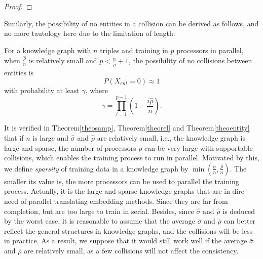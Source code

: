 \documentclass[sigconf]{acmart}
\begin{document}
\begin{proof}
\end{proof}


Similarly, the possibility of no entities in a collision can be derived as follows, and no more tautology here due to the limitation of length.
\begin{theorem}
\label{theoentity}
For a knowledge graph with $n$ triples and training in $p$ processors in parallel, 
when $\frac{\hat{\rho}}{n}$ is relatively small and $p < \frac{n}{\hat{\rho}}+1$, the possibility of no collisions between entities is 
\begin{equation}
P(X_{ent}=0) \approx 1
\end{equation}
with probability at least $\gamma$, where 
\begin{equation}
\gamma=\prod \limits_{i=1}^{p-1}(1- \frac{i\hat{\rho}}{n}).
\end{equation}
\end{theorem}


It is verified in Theorem\ref{theosamp}, Theorem\ref{theorel} and Theorem\ref{theoentity} that if $n$ is large and $\hat{\sigma}$ and $\hat{\rho}$ are relatively small, i.e., the knowledge graph is large and sparse, the number of processors $p$ can be very large with supportable collisions, which enables the training process to run in parallel. Motivated by this, we define \emph{sparsity} of training data in a knowledge graph by $\min(\frac{\hat{\sigma}}{n},\frac{\hat{\rho}}{n})$. The smaller its value is, the more processors can be used to parallel the training process. Actually, it is the large and sparse knowledge graphs that are in dire need of  parallel translating embedding methods. Since they are far from completion, but are too large to train in serial. Besides, since $\hat{\sigma}$ and $\hat{\rho}$ is deduced by the worst case, it is reasonable to assume that the average $\bar{{\sigma}}$ and $\bar{{\rho}}$  can better reflect the general structures in knowledge graphs, and the collisions will be less in practice. As a result, we suppose that it would still work well if the average $\bar{{\sigma}}$ and $\bar{{\rho}}$ are relatively small, as a few collisions will not affect the consistency. 
\end{document}
